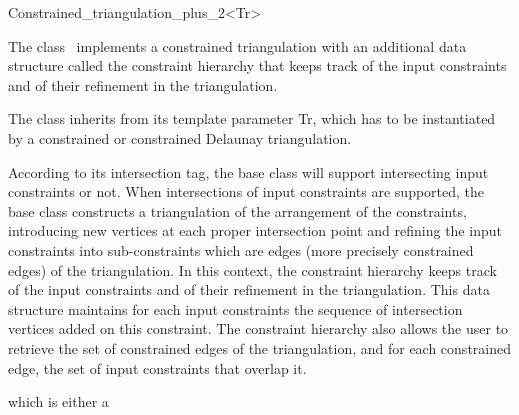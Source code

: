 

\begin{ccRefClass}{Constrained_triangulation_plus_2<Tr>}  %


The class \ccRefName\ 
implements a constrained triangulation 
with an additional data
structure called the  constraint hierarchy 
that keeps track of  the input constraints and of their refinement
in the triangulation.

The class 
inherits from its template parameter Tr, which has to be instantiated
by a constrained or constrained Delaunay  triangulation.

According to its intersection tag, the base class
will support intersecting input constraints or not.
When intersections of input constraints are supported,
the base class constructs a triangulation  of the  arrangement
of the constraints,
introducing new vertices at each proper intersection
point and  refining the input constraints into sub-constraints
which are edges (more precisely constrained edges) of the
triangulation. 
In this context, the constraint hierarchy 
keeps track of  the input constraints and of their refinement
in the triangulation. This data structure 
maintains for each input constraints 
the sequence of intersection vertices added on this constraint.
The constraint hierarchy also allows the user to retrieve the set
of constrained edges of the triangulation, and for each
constrained edge,  the set of input constraints that overlap it.


\ccInheritsFrom
{} which is either a 
\end{ccRefClass}
